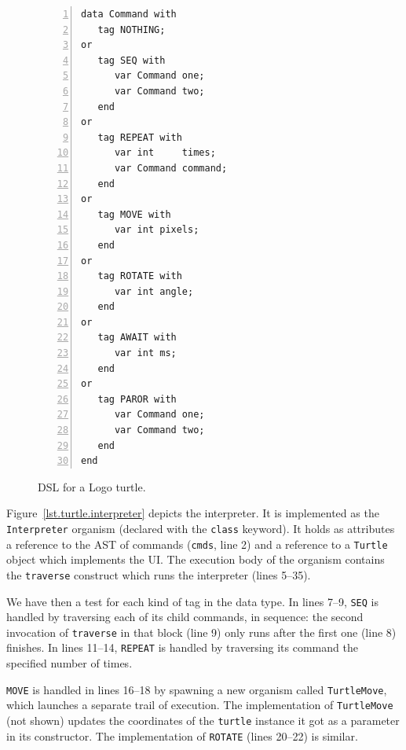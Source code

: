 \documentclass{acm_proc_article-sp}
\newcommand{\code}[1] {{\small{\texttt{#1}}}}
\begin{document}
\begin{figure}%
\begin{lstlisting}[numbers=left,xleftmargin=3em]
data Command with
   tag NOTHING;
or
   tag SEQ with
      var Command one;
      var Command two;
   end
or
   tag REPEAT with
      var int     times;
      var Command command;
   end
or
   tag MOVE with
      var int pixels;
   end
or
   tag ROTATE with
      var int angle;
   end
or
   tag AWAIT with
      var int ms;
   end
or
   tag PAROR with
      var Command one;
      var Command two;
   end
end
\end{lstlisting}
\caption{ DSL for a Logo turtle.
\label{lst.turtle.dsl}
}
\end{figure}


Figure~\ref{lst.turtle.interpreter} depicts the interpreter. It is implemented
as the \code{Interpreter} organism (declared with the \code{class} keyword).
It holds as attributes a reference to the AST of commands (\code{cmds}, line 2)
and a reference to a \code{Turtle} object which implements the UI. The
execution body of the organism contains the \code{traverse} construct which
runs the interpreter (lines 5--35).

We have then a test for each kind of tag in the data type. In lines 7--9,
\code{SEQ} is handled by traversing each of its child commands, in sequence:
the second invocation of \code{traverse} in that block (line 9) only runs
after the first one (line 8) finishes. In lines 11--14, \code{REPEAT} is
handled by traversing its command the specified number of times.

\code{MOVE} is handled in lines 16--18 by spawning a new organism called
\code{TurtleMove}, which launches a separate trail of execution. The
implementation of \code{TurtleMove} (not shown) updates the coordinates of the
\code{turtle} instance it got as a parameter in its constructor. The
implementation of \code{ROTATE} (lines 20--22) is similar.
\end{document}

